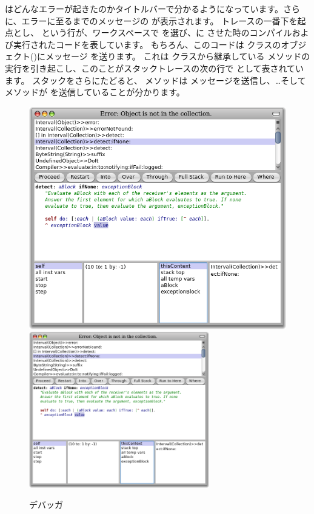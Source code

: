 \documentclass[a4paper,10pt,twoside]{book}
\begin{document}
 はどんなエラーが起きたのかタイトルバーで分かるようになっています。さらに、エラーに至るまでのメッセージの  が表示されます。
トレースの一番下を起点とし、  という行が、ワークスペースで  を選び、\pharo に  させた時のコンパイルおよび実行されたコードを表しています。
もちろん、このコードは  クラスのオブジェクト()にメッセージ  を送ります。
これは  クラスから継承している  メソッドの実行を引き起こし、このことがスタックトレースの次の行で  として表されています。
スタックをさらにたどると、 メソッドは  メッセージを送信し、\ldots そして  メソッドが  を送信していることが分かります。

\begin{figure}[btp]
\begin{center}
\ifluluelse
{\includegraphics[width=\textwidth]{debuggerDetectIfNone}}
{\includegraphics[width=0.7\textwidth]{debuggerDetectIfNone}}
\end{center}
\caption{デバッガ}
\end{figure}
\end{document}
